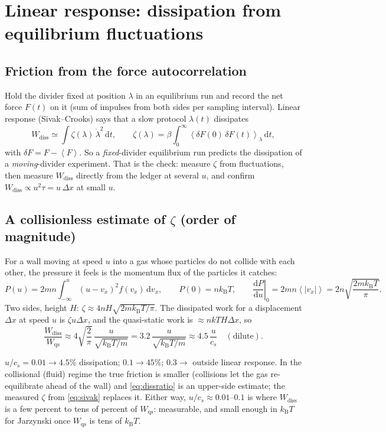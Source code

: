 \documentclass[11pt,a4paper]{article}
\newcommand{\kT}{k_{\mathrm B}T}
\newcommand{\avg}[1]{\left\langle #1 \right\rangle}
\newcommand{\dd}{\mathrm{d}}
\begin{document}
\section{Linear response: dissipation from equilibrium fluctuations}

\subsection{Friction from the force autocorrelation}
Hold the divider fixed at position $\lambda$ in an equilibrium run and record the net force $F(t)$ on it (sum of impulses from both sides per sampling interval). Linear response (Sivak--Crooks) says that a slow protocol $\lambda(t)$ dissipates
\begin{equation}
W_{\mathrm{diss}} \simeq \int \zeta(\lambda)\,\dot\lambda^2\,\dd t,\qquad
\zeta(\lambda) = \beta\int_0^\infty\avg{\delta F(0)\,\delta F(t)}_\lambda\,\dd t ,
\label{eq:sivak}
\end{equation}
with $\delta F = F - \avg F$. So a \emph{fixed}-divider equilibrium run predicts the dissipation of a \emph{moving}-divider experiment. That is the check: measure $\zeta$ from fluctuations, then measure $W_{\mathrm{diss}}$ directly from the ledger at several $u$, and confirm $W_{\mathrm{diss}} \propto u^2\tau = u\,\Delta x$ at small $u$.

\subsection{A collisionless estimate of \texorpdfstring{$\zeta$}{zeta} (order of magnitude)}
For a wall moving at speed $u$ into a gas whose particles do not collide with each other, the pressure it feels is the momentum flux of the particles it catches:
\begin{equation}
P(u) = 2mn\int_{-\infty}^{u}(u - v_x)^2 f(v_x)\,\dd v_x,\qquad
P(0) = n\kT,\qquad
\left.\frac{\dd P}{\dd u}\right|_0 = 2mn\avg{|v_x|} = 2n\sqrt{\frac{2m\kT}{\pi}} .
\end{equation}
Two sides, height $H$: $\zeta \approx 4nH\sqrt{2m\kT/\pi}$. The dissipated work for a displacement $\Delta x$ at speed $u$ is $\zeta u\Delta x$, and the quasi-static work is $\approx nkT H\Delta x$, so
\begin{equation}
\frac{W_{\mathrm{diss}}}{W_{\mathrm{qs}}} \approx 4\sqrt{\frac2\pi}\,\frac{u}{\sqrt{\kT/m}} = 3.2\,\frac{u}{\sqrt{\kT/m}} \approx 4.5\,\frac{u}{c_s}\quad(\text{dilute}).
\label{eq:dissratio}
\end{equation}
\begin{worked}
$u/c_s = 0.01 \to 4.5\%$ dissipation; $0.1 \to 45\%$; $0.3 \to$ outside linear response. In the collisional (fluid) regime the true friction is smaller (collisions let the gas re-equilibrate ahead of the wall) and \eqref{eq:dissratio} is an upper-side estimate; the measured $\zeta$ from \eqref{eq:sivak} replaces it. Either way, $u/c_s \approx 0.01$--$0.1$ is where $W_{\mathrm{diss}}$ is a few percent to tens of percent of $W_{\mathrm{qs}}$: measurable, and small enough in $\kT$ for Jarzynski once $W_{\mathrm{qs}}$ is tens of $\kT$.
\end{worked}
\end{document}
